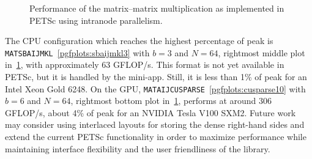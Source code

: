 \documentclass[3p,11pt]{elsarticle}
\newcommand{\pk}[1]{\texttt{#1}}
\begin{document}
\begin{figure}[tbp]
   \caption{Performance of the matrix--matrix multiplication as implemented in PETSc using intranode parallelism. \label{fig:perfAXpar}}
\end{figure}


The CPU configuration which reaches the
highest percentage of peak is \pk{MATSBAIJMKL}~\ref{pgfplots:sbaijmkl3} with $b=3$
and $N=64$, rightmost middle plot in~\cref{fig:perfAXpar}, with approximately
63 GFLOP/s. This format is not yet available in PETSc, but it is handled by the
mini-app. Still, it is less than 1\% of peak for an Intel Xeon Gold 6248.
On the GPU, \pk{MATAIJCUSPARSE}~\ref{pgfplots:cusparse10} with $b=6$
and $N=64$, rightmost bottom plot in~\cref{fig:perfAXpar}, performs at around
306 GFLOP/s, about 4\% of peak for an NVIDIA Tesla V100 SXM2. Future work may
consider using interlaced layouts for storing the dense right-hand sides and extend the
current PETSc functionality in order to maximize performance while maintaining interface flexibility
and the user friendliness of the library.
\end{document}
